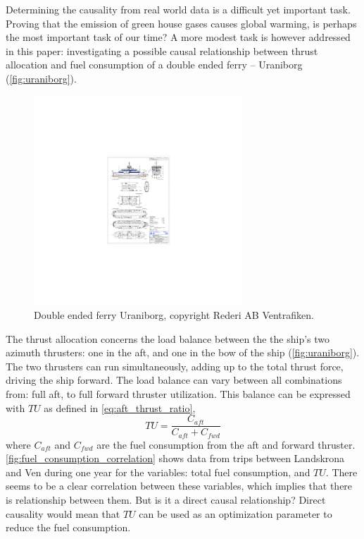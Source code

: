 \documentclass[fleqn,10pt]{olplainarticle}
\begin{document}
Determining the causality from real world data is a difficult yet important task. Proving that the emission of green house gases causes global warming, is perhaps the most important task of our time? A more modest task is however addressed in this paper: investigating a possible causal relationship between thrust allocation and fuel consumption of a double ended ferry -- Uraniborg (\autoref{fig:uraniborg}).
\begin{figure}[!htb]
    \centering
    \includegraphics[width=0.7\textwidth]{figures/GA_uraniborg.pdf}
    \caption{Double ended ferry Uraniborg, copyright Rederi AB Ventrafiken.}
    \label{fig:uraniborg}
\end{figure}
The thrust allocation concerns the load balance between the the ship's two azimuth thrusters: one in the aft, and one in the bow of the ship (\autoref{fig:uraniborg}). The two thrusters can run simultaneously, adding up to the total thrust force, driving the ship forward. The load balance can vary between all combinations from: full aft, to full forward thruster utilization. This balance can be expressed with $TU$ as defined in \autoref{eq:aft_thrust_ratio},
\begin{equation}
    TU = \frac{C_{aft}}{C_{aft} + C_{fwd}}
    \label{eq:aft_thrust_ratio}
\end{equation}
where $C_{aft}$ and $C_{fwd}$ are the fuel consumption from the aft and forward thruster.
\autoref{fig:fuel_consumption_correlation} shows data from trips between Landskrona and Ven during one year for the variables: total fuel consumption, and $TU$. There seems to be a clear correlation between these variables,  which implies that there is relationship between them. But is it a direct causal relationship? Direct causality would mean that $TU$ can be used as an optimization parameter to reduce the fuel consumption.
\end{document}
